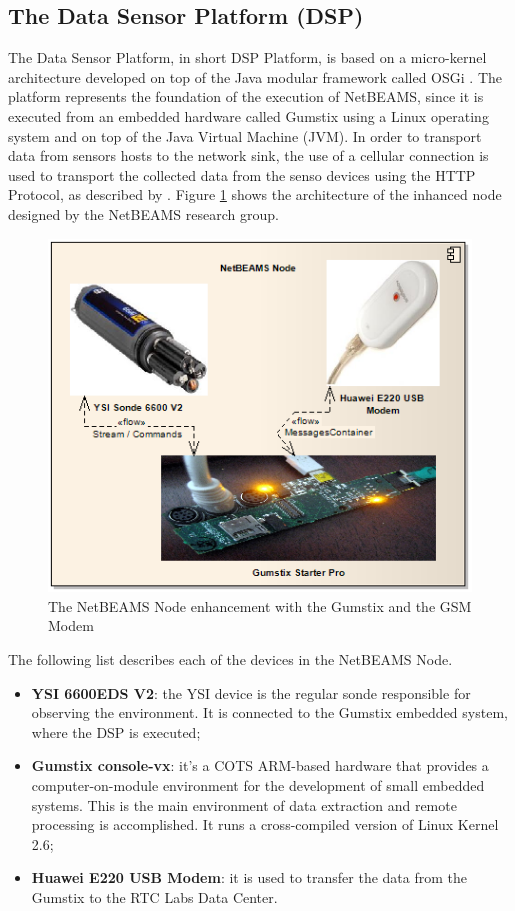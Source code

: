\subsection{The Data Sensor Platform (DSP)}

The Data Sensor Platform, in short DSP Platform, is based on a micro-kernel
architecture developed on top of the Java modular framework called OSGi
\cite{osgi}. The platform represents the foundation of the execution of
NetBEAMS, since it is executed from an embedded hardware called Gumstix
\cite{gumstix} using a Linux operating system and on top of the Java Virtual
Machine (JVM). In order to transport data from sensors hosts to the network
sink, the use of a cellular connection is used to transport the collected data
from the senso devices using the HTTP Protocol, as described by
\cite{netbeams2009}. Figure \ref{fig:sf-netbeams-node} shows the
architecture of the inhanced node designed by the NetBEAMS research group.

\begin{figure}
  \centering
  \includegraphics{../diagrams/DSP-Gateway-Node}
  \caption{The NetBEAMS Node enhancement with the Gumstix and the GSM Modem}
  \label{fig:sf-netbeams-node}
\end{figure}

The following list describes each of the devices in the NetBEAMS Node.

\begin{itemize}
  \item \textbf{YSI 6600EDS V2}: the YSI device is the regular sonde
  responsible for observing the environment. It is connected to the Gumstix
  embedded system, where the DSP is executed;
  \item \textbf{Gumstix console-vx}: it's a COTS ARM-based hardware that
  provides a computer-on-module environment for the development of small
  embedded systems. This is the main environment of data extraction and remote
  processing is accomplished. It runs a cross-compiled version of Linux Kernel
  2.6;
  \item \textbf{Huawei E220 USB Modem}: it is used to transfer the data from the
  Gumstix to the RTC Labs Data Center.
\end{itemize} 


